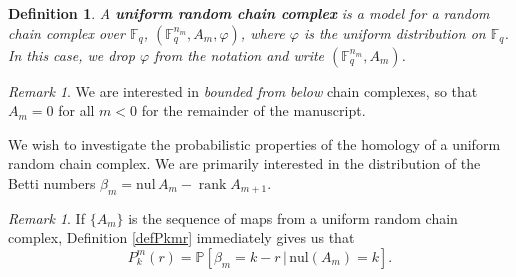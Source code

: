 \documentclass[3p,times]{elsarticle}
\newtheorem{definition}[theorem]{Definition}
\theoremstyle{remark}
\newtheorem{remark}[theorem]{Remark}
\DeclareMathOperator{\rank}{\mathrm{rank}}
\newcommand\Fqn[1]{\mathbb{F}_q^{#1}}
\newcommand{\nul}{\mathrm{nul}}
\newcommand{\st}{\,|\,} %
\begin{document}
\begin{definition}
  A {\bf uniform random chain complex} is a model for a random chain complex over $\Fqn{}$, $(\Fqn{n_m},A_m,\varphi)$, where $\varphi$ is the uniform distribution on $\Fqn{}$. In this case, we drop $\varphi$ from the notation and write $(\Fqn{n_m}, A_m)$.
  \label{defn:random_chain_cx}
\end{definition}

\begin{remark}
  \label{rem:bdd}
  We are interested in {\em bounded from below} chain complexes, so that $A_m = 0$ for all $m < 0$
  for the remainder of the manuscript.
\end{remark}

We wish to investigate the probabilistic properties of the homology of a uniform random
chain complex.  We are primarily interested in the distribution of the Betti
numbers $\beta_m = \nul \,A_m - \rank A_{m+1}$.

\begin{remark}
If $\{A_m\}$ is the sequence of maps from a uniform random chain complex, Definition
\ref{defPkmr} immediately gives us that
\[
  P^m_k(r) = \mathbb{P}\left[\beta_m = k-r \st \nul(A_{m}) = k\right].
\]
\end{remark}
\end{document}
